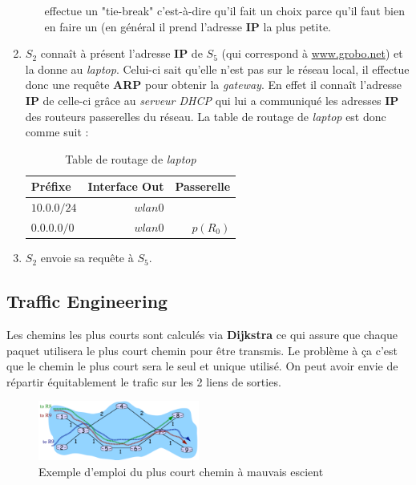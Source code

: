 \documentclass{article}
\newcommand{\term}[1]{\textit{\textcolor{maintitle}{#1}}}
\begin{document}
\begin{sffamily}
\begin{enumerate}
\begin{itemize}
effectue un "tie-break" c'est-à-dire qu'il fait un choix parce qu'il faut bien en faire un (en général il prend l'adresse 
\textbf{IP} la plus petite.
\end{itemize}
\item $S_2$ connaît à présent l'adresse \textbf{IP} de $S_5$ (qui correspond à \url{www.grobo.net}) et la donne au 
\textit{laptop}. 
Celui-ci sait qu'elle n'est pas sur le réseau local, il effectue donc une requête \textbf{ARP} pour obtenir la \textit{gateway}. 
En effet il connaît l'adresse \textbf{IP} de celle-ci grâce au \term{serveur DHCP} qui lui a communiqué les adresses \textbf{IP} 
des routeurs passerelles du réseau. La table de routage de \textit{laptop} est donc comme suit :
\begin{table}[h!]
\begin{center}
\begin{tabular}{l|r|r}
Préfixe & Interface Out & Passerelle \\
\hline
$10.0.0/24$ & $wlan0$ & \\
$0.0.0.0/0$ & $wlan0$ & $p(R_0)$\\
\end{tabular}
\end{center}
\caption{Table de routage de \textit{laptop}}
\end{table}
\item $S_2$ envoie sa requête à $S_5$.
\end{enumerate}

\subsection{Traffic Engineering}

Les chemins les plus courts sont calculés via \textbf{Dijkstra} ce qui assure que chaque paquet utilisera le plus court chemin 
pour être transmis. Le problème à ça c'est que le chemin le plus court sera le seul et unique utilisé. On peut avoir envie de 
répartir équitablement le trafic sur les 2 liens de sorties.

\begin{figure}[h!]
    \begin{center}
    \includegraphics[width=200px]{img_002.pdf}
    \caption{Exemple d'emploi du plus court chemin à mauvais escient}
    \end{center}	
\end{figure}


\end{sffamily}
\end{document}
